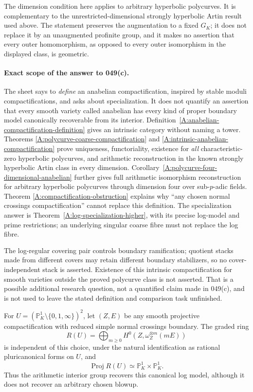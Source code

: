 The dimension condition here applies to arbitrary hyperbolic
polycurves. It is complementary to the unrestricted-dimensional
strongly hyperbolic Artin result used above. The statement preserves
the augmentation to a fixed $G_K$; it does not replace it by an
unaugmented profinite group, and it makes no assertion that every
outer homomorphism, as opposed to every outer isomorphism in the
displayed class, is geometric.

\paragraph{Exact scope of the answer to 049(c).}
The sheet says to \emph{define} an anabelian compactification,
inspired by stable moduli compactifications, and asks about
specialization. It does not quantify an assertion that every
smooth variety called anabelian has every kind of proper
boundary model canonically recoverable from its interior.
Definition~\ref{A:anabelian-compactification-definition} gives
an intrinsic category without naming a tower. Theorems
\ref{A:polycurve-coarse-compactification} and
\ref{A:intrinsic-anabelian-compactification} prove uniqueness,
functoriality, existence for \emph{all} characteristic-zero
hyperbolic polycurves, and arithmetic reconstruction in the
known strongly hyperbolic Artin class in every dimension.
Corollary~\ref{A:polycurve-four-dimensional-anabelian} further gives
full arithmetic isomorphism reconstruction for arbitrary hyperbolic
polycurves through dimension four over sub-$p$-adic fields. Theorem
\ref{A:compactification-obstruction} explains why ``any chosen
normal crossings compactification'' cannot replace this
definition. The specialization answer is
Theorem~\ref{A:log-specialization-higher}, with its precise
log-model and prime restrictions; an underlying singular
coarse fibre must not replace the log fibre.

The log-regular covering pair controls boundary ramification;
quotient stacks made from different covers may retain different
boundary stabilizers, so no cover-independent stack is asserted.
Existence of this intrinsic compactification for smooth varieties
outside the proved polycurve class is not asserted. That is a
possible additional research question, not a quantified claim
made in 049(c), and is not used to leave the stated definition
and comparison task unfinished.

\begin{proposition}
\label{A:canonical-log-model-product}
For $U=(\mathbb P^1_K\setminus\{0,1,\infty\})^2$, let
$(Z,E)$ be any smooth projective compactification with reduced
simple normal crossings boundary. The graded ring
\[
 R(U)=\bigoplus_{m\ge0}H^0(Z,\omega_Z^{\otimes m}(mE))
\]
is independent of this choice, under the natural identification
as rational pluricanonical forms on $U$, and
\[
 \operatorname{Proj}R(U)\simeq\mathbb P^1_K\times\mathbb P^1_K.
\]
Thus the arithmetic interior group recovers this canonical log
model, although it does not recover an arbitrary chosen blowup.
\end{proposition}

